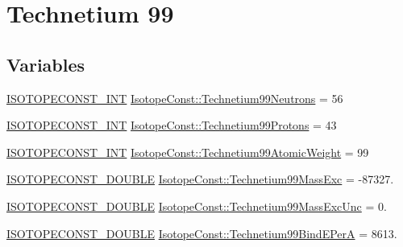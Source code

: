 \hypertarget{group___isotope_const-_technetium-_tc99}{}\section{Technetium 99}
\label{group___isotope_const-_technetium-_tc99}
\subsection*{Variables}
\begin{DoxyCompactItemize}
\item 
\mbox{\hyperlink{group___isotope_const-_macros_ga5f18360b3e99483a35c32d789e62621c}{I\+S\+O\+T\+O\+P\+E\+C\+O\+N\+S\+T\+\_\+\+I\+NT}} \mbox{\hyperlink{group___isotope_const-_technetium-_tc99_gac093abb7542dc31b86ff8f2778307dc5}{Isotope\+Const\+::\+Technetium99\+Neutrons}} = 56
\item 
\mbox{\hyperlink{group___isotope_const-_macros_ga5f18360b3e99483a35c32d789e62621c}{I\+S\+O\+T\+O\+P\+E\+C\+O\+N\+S\+T\+\_\+\+I\+NT}} \mbox{\hyperlink{group___isotope_const-_technetium-_tc99_ga6396ed0e483ffb00f6918aeff9e3fa12}{Isotope\+Const\+::\+Technetium99\+Protons}} = 43
\item 
\mbox{\hyperlink{group___isotope_const-_macros_ga5f18360b3e99483a35c32d789e62621c}{I\+S\+O\+T\+O\+P\+E\+C\+O\+N\+S\+T\+\_\+\+I\+NT}} \mbox{\hyperlink{group___isotope_const-_technetium-_tc99_ga387580c172d738300cb33a2949ecc48e}{Isotope\+Const\+::\+Technetium99\+Atomic\+Weight}} = 99
\item 
\mbox{\hyperlink{group___isotope_const-_macros_ga8f45a7272ce02c0b4c65c44636ed719a}{I\+S\+O\+T\+O\+P\+E\+C\+O\+N\+S\+T\+\_\+\+D\+O\+U\+B\+LE}} \mbox{\hyperlink{group___isotope_const-_technetium-_tc99_ga751644445fbdc8e4e30a98dc8b0a08a7}{Isotope\+Const\+::\+Technetium99\+Mass\+Exc}} = -\/87327.
\item 
\mbox{\hyperlink{group___isotope_const-_macros_ga8f45a7272ce02c0b4c65c44636ed719a}{I\+S\+O\+T\+O\+P\+E\+C\+O\+N\+S\+T\+\_\+\+D\+O\+U\+B\+LE}} \mbox{\hyperlink{group___isotope_const-_technetium-_tc99_ga7565f5bc74f4131fae98aad6aca71fa9}{Isotope\+Const\+::\+Technetium99\+Mass\+Exc\+Unc}} = 0.
\item 
\mbox{\hyperlink{group___isotope_const-_macros_ga8f45a7272ce02c0b4c65c44636ed719a}{I\+S\+O\+T\+O\+P\+E\+C\+O\+N\+S\+T\+\_\+\+D\+O\+U\+B\+LE}} \mbox{\hyperlink{group___isotope_const-_technetium-_tc99_gac4f7707ba28d1ae50377e0ace73b82a9}{Isotope\+Const\+::\+Technetium99\+Bind\+E\+PerA}} = 8613.
\item 

\end{DoxyCompactItemize}
